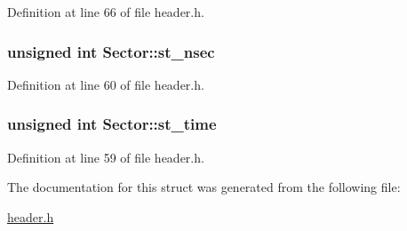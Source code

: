 Definition at line 66 of file header.h.\hypertarget{structSector_a72c3039773213b2bac9be3c2084e6c1c}{
\subsubsection[{st\_\-nsec}]{\setlength{\rightskip}{0pt plus 5cm}unsigned int {\bf Sector::st\_\-nsec}}}
\label{structSector_a72c3039773213b2bac9be3c2084e6c1c}


Definition at line 60 of file header.h.\hypertarget{structSector_a458764b8477c5ec16e14ff14859fb32a}{
\subsubsection[{st\_\-time}]{\setlength{\rightskip}{0pt plus 5cm}unsigned int {\bf Sector::st\_\-time}}}
\label{structSector_a458764b8477c5ec16e14ff14859fb32a}


Definition at line 59 of file header.h.

The documentation for this struct was generated from the following file:\begin{DoxyCompactItemize}
\item 
\hyperlink{header_8h}{header.h}\end{DoxyCompactItemize}

